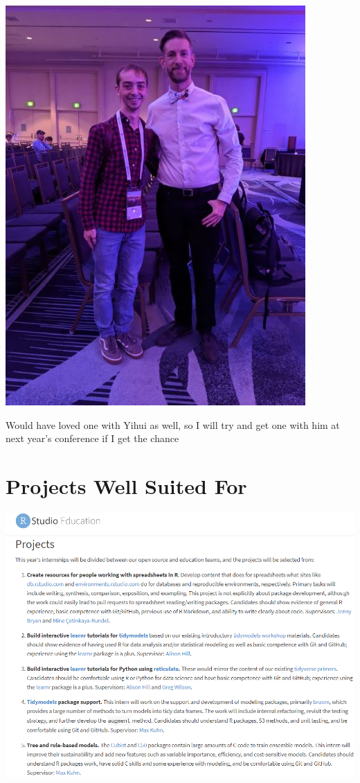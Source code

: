 \documentclass[
]{book}
\begin{document}
\includegraphics{images/pic_with_hadley.jpg}

Would have loved one with Yihui as well, so I will try and get one with him at next year's conference if I get the chance

\hypertarget{projects-well-suited-for}{%
\chapter{Projects Well Suited For}\label{projects-well-suited-for}}

\includegraphics{images/projects_list.png}
\end{document}
